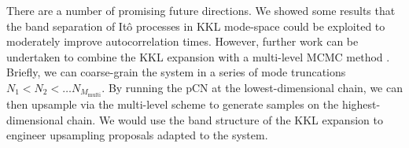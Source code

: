 There are a number of promising future directions. We showed some results that the band separation of It\^{o} processes in KKL mode-space could be exploited to moderately improve autocorrelation times. However, further work can be undertaken to combine the KKL expansion with a multi-level MCMC method \citep{gilesMultilevelMonteCarlo2008, dodwellHierarchicalMultilevelMarkov2015, jansenMultilevelMonteCarlo2020, rohrbachMultilevelSimulationHardsphere2022}. Briefly, we can coarse-grain the system in a series of mode truncations $N_1 < N_2 < \dots N_{M_\text{multi}}$. By running the pCN at the lowest-dimensional chain, we can then upsample via the multi-level scheme to generate samples on the highest-dimensional chain. We would use the band structure of the KKL expansion to engineer upsampling proposals adapted to the system.

